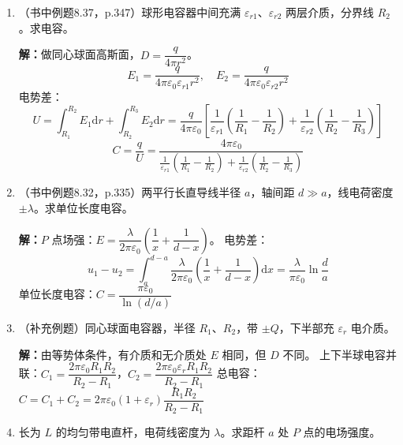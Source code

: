 \documentclass{ctexart}
\begin{document}
\begin{enumerate}
\textbf{解：}作圆柱形高斯面，由 $\displaystyle\oint_S \vec{D}\cdot\mathrm{d}\vec{S} = \sigma_0\Delta S$ 得：
\[
D_1 = D_2 = \sigma_0,\quad E_1 = \frac{\sigma_0}{\varepsilon_0\varepsilon_{r1}},\quad
E_2 = \frac{\sigma_0}{\varepsilon_0\varepsilon_{r2}}
\]
电势差：
\[
\Delta u = E_1 d_1 + E_2 d_2 = \frac{\sigma_0}{\varepsilon_0}\left(\frac{d_1}{\varepsilon_{r1}} + \frac{d_2}{\varepsilon_{r2}}\right)
\]
电容：
\[
C = \frac{q}{\Delta u} = \frac{\varepsilon_1\varepsilon_2 S}{\varepsilon_1 d_2 + \varepsilon_2 d_1}
\]

\item（书中例题8.37，p.347）球形电容器中间充满 $\varepsilon_{r1}$、$\varepsilon_{r2}$ 两层介质，分界线 $R_2$。求电容。

\textbf{解：}做同心球面高斯面，$D = \dfrac{q}{4\pi r^{2}}$。
\[
E_1 = \frac{q}{4\pi\varepsilon_0\varepsilon_{r1} r^{2}},\quad
E_2 = \frac{q}{4\pi\varepsilon_0\varepsilon_{r2} r^{2}}
\]
电势差：
\[
U = \int_{R_1}^{R_2} E_1\mathrm{d}r + \int_{R_2}^{R_3} E_2\mathrm{d}r
= \frac{q}{4\pi\varepsilon_0}\left[\frac{1}{\varepsilon_{r1}}\left(\frac{1}{R_1} - \frac{1}{R_2}\right) + \frac{1}{\varepsilon_{r2}}\left(\frac{1}{R_2} - \frac{1}{R_3}\right)\right]
\]
\[
C = \frac{q}{U} = \frac{4\pi\varepsilon_0}{\displaystyle\frac{1}{\varepsilon_{r1}}\left(\frac{1}{R_1} - \frac{1}{R_2}\right) + \frac{1}{\varepsilon_{r2}}\left(\frac{1}{R_2} - \frac{1}{R_3}\right)}
\]

\item（书中例题8.32，p.335）两平行长直导线半径 $a$，轴间距 $d \gg a$，线电荷密度 $\pm\lambda$。求单位长度电容。

\textbf{解：}$P$ 点场强：$E = \dfrac{\lambda}{2\pi\varepsilon_0}\left(\dfrac{1}{x} + \dfrac{1}{d-x}\right)$。
电势差：
\[
u_1 - u_2 = \int_a^{d-a} \frac{\lambda}{2\pi\varepsilon_0}\left(\frac{1}{x} + \frac{1}{d-x}\right)\mathrm{d}x
= \frac{\lambda}{\pi\varepsilon_0}\ln\frac{d}{a}
\]
单位长度电容：$C = \dfrac{\pi\varepsilon_0}{\ln(d/a)}$

\item（补充例题）同心球面电容器，半径 $R_1$、$R_2$，带 $\pm Q$，下半部充 $\varepsilon_r$ 电介质。

\textbf{解：}由等势体条件，有介质和无介质处 $E$ 相同，但 $D$ 不同。
上下半球电容并联：$C_1 = \dfrac{2\pi\varepsilon_0 R_1R_2}{R_2 - R_1}$，$C_2 = \dfrac{2\pi\varepsilon_0\varepsilon_r R_1R_2}{R_2 - R_1}$
总电容：$C = C_1 + C_2 = 2\pi\varepsilon_0(1+\varepsilon_r)\dfrac{R_1R_2}{R_2 - R_1}$

\item 长为 $L$ 的均匀带电直杆，电荷线密度为 $\lambda$。求距杆 $a$ 处 $P$ 点的电场强度。


\end{enumerate}
\end{document}
